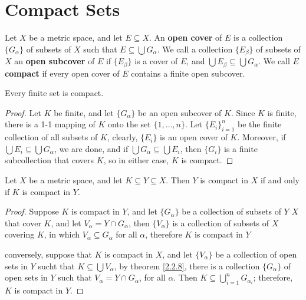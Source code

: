 
\section{Compact Sets}

\begin{definition}
    Let $X$ be a metric space, and let $E \subseteq X$. An \textbf{open cover} of $E$
    is a collection $\{G_{\alpha}\}$ of subsets of  $X$ such that  $E \subseteq \bigcup{G_{\alpha}}$.
    We call a collection  $\{E_{\beta}\}$ of subsets of  $X$ an \textbf{open subcover} of  $E$
    if  $\{E_{\beta}\}$ is a cover of  $E$, and  $\bigcup{E_{\beta}} \subseteq \bigcup{G_{\alpha}}$. We call $E$
    \textbf{compact} if every open cover of  $E$ contains a finite open subcover.
\end{definition}

\begin{lemma}\label{2.3.1}
    Every finite set is compact.
\end{lemma}
\begin{proof}
    Let $K$ be finite, and let  $\{G_{\alpha}\}$ be an open subcover of  $K$. Since
    $K$ is finite, there is a 1-1 mapping of  $K$ onto the set  $\{1,\dots, n\}$. Let
    $\{E_i\}_{i=1}^{n}$	be the finite collection of all subsets of $K$, clearly,  $\{E_i\}$
    is an open cover of $K$. Moreover, if  $\bigcup{E_i} \subseteq \bigcup{G_{\alpha}}$, we are done, and
    if $\bigcup{G_{\alpha}} \subseteq \bigcup{E_i}$, then $\{G_i\}$ is a finite subcollection that
    covers  $K$, so in either case,  $K$ is compact.
\end{proof}

\begin{theorem}\label{2.3.2}
    Let $X$ be a metric space, and let  $K \subseteq Y \subseteq X$. Then  $Y$ is compact in  $X$
    if and only if  $K$ is compact in  $Y$.
\end{theorem}
\begin{proof}
    Suppose $K$ is compact in  $Y$, and let  $\{G_{\alpha}\}$ be a collection of subsets of  $Y$
    $X$ that cover  $K$, and let  $V_{\alpha}=Y \cap G_{\alpha}$, then  $\{V_{\alpha}\}$ is
    a collection of subsets of  $X$ covering  $K$, in which  $V_{\alpha} \subseteq G_{\alpha}$ for
    all  $\alpha$, therefore  $K$ is compact in $Y$

    conversely, suppose that $K$ is compact in $X$, and let  $\{V_{\alpha}\}$ be a collection
    of open sets in  $Y$ sucht that  $K \subseteq \bigcup{V_{\alpha}}$, by theorem \ref{2.2.8},
    there is a collection $\{G_{\alpha}\}$ of open sets in  $Y$ such that  $V_{\alpha}=Y \cap G_{\alpha}$,
    for all  $\alpha$. Then  $K \subseteq \bigcup_{i=1}^{n}{G_{\alpha_i}}$; therefore,  $K$ is compact in  $Y$.
\end{proof}

